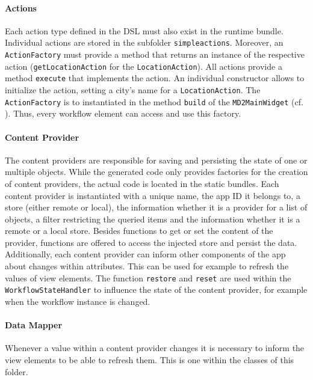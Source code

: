 \paragraph{Actions}
Each action type defined in the \MD DSL must also exist in the \MD runtime bundle. Individual actions are stored in the subfolder \lstinline!simpleactions!. Moreover, an \lstinline!ActionFactory! must provide a method that returns an instance of the respective action (\eg \lstinline!getLocationAction! for the \lstinline!LocationAction!). All actions provide a method \lstinline!execute! that implements the action. An individual constructor allows to initialize the action, \eg setting a city's name for a \lstinline!LocationAction!. The \lstinline!ActionFactory! is to instantiated in the method \lstinline!build! of the \lstinline!MD2MainWidget! (cf. ). Thus, every workflow element can access and use this factory.

\paragraph{Content Provider}\label{par:contentProvider}
The content providers are responsible for saving and persisting the state of one or multiple objects. While the generated code only provides factories for the creation of content providers, the actual code is located in the static bundles. Each content provider is instantiated with a unique name, the app ID it belongs to, a store (either remote or local), the information whether it is a provider for a list of objects, a filter restricting the queried items and the information whether it is a remote or a local store.
Besides functions to get or set the content of the provider, functions are offered to access the injected store and persist the data.
Additionally, each content provider can inform other components of the app about changes within attributes. This can be used for example to refresh the values of view elements.
The function \lstinline|restore| and \lstinline|reset| are used within the \lstinline|WorkflowStateHandler| to  influence the state of the content provider, for example when the workflow instance is changed.

\paragraph{Data Mapper}
Whenever a value within a content provider changes it is necessary to inform the view elements to be able to refresh them. This is one within the classes of this folder.

